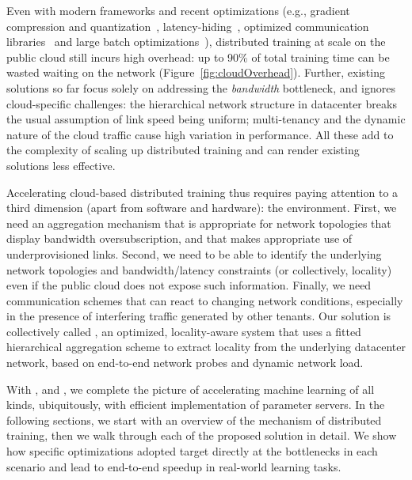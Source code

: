 Even with modern frameworks and recent optimizations 
(e.g., gradient compression and quantization~\cite{lin2017deep, cntk1bt, lim20183lc}, latency-hiding~\cite{poseidon, jayarajan2019priority,hashemi2018tictac}, optimized communication libraries~\cite{facebook35:online, Operatio73:online, dmlcpsli50:online} and large batch optimizations~\cite{ImageNetIn1Hour}), distributed training at scale on the public cloud still incurs high overhead: up to 90\% of total training time can be wasted waiting on the network (Figure~\ref{fig:cloudOverhead}). Further, existing solutions so far focus solely on addressing the \textit{bandwidth} bottleneck, and ignores cloud-specific challenges: the hierarchical network structure in datacenter breaks the usual assumption of link speed being uniform; multi-tenancy and the dynamic nature of the cloud traffic cause high variation in performance. All these add to the complexity of scaling up distributed training and can render existing solutions less effective. 

Accelerating cloud-based distributed training thus requires paying attention to a third dimension (apart from software and hardware): the environment. First, we need an aggregation mechanism that is appropriate for network topologies that display bandwidth oversubscription, and that makes appropriate use of underprovisioned links.  Second, we need to be able to identify the underlying network topologies and bandwidth/latency constraints (or collectively, locality) even if the public cloud does not expose such information.  Finally, we need communication schemes that can react to changing network conditions, especially in the presence of interfering traffic generated by other tenants. Our solution is collectively called \plink, an optimized, locality-aware system that uses a fitted hierarchical aggregation scheme to extract locality from the underlying datacenter network, based on end-to-end network probes and dynamic network load.

With \pbox, \phub and \plink, we complete the picture of accelerating machine learning of all kinds, ubiquitously, with efficient implementation of parameter servers. In the following sections, we start with an overview of the mechanism of distributed training, then we walk through each of the proposed solution in detail. We show how specific optimizations adopted target directly at the bottlenecks in each scenario and lead to end-to-end speedup in real-world learning tasks.